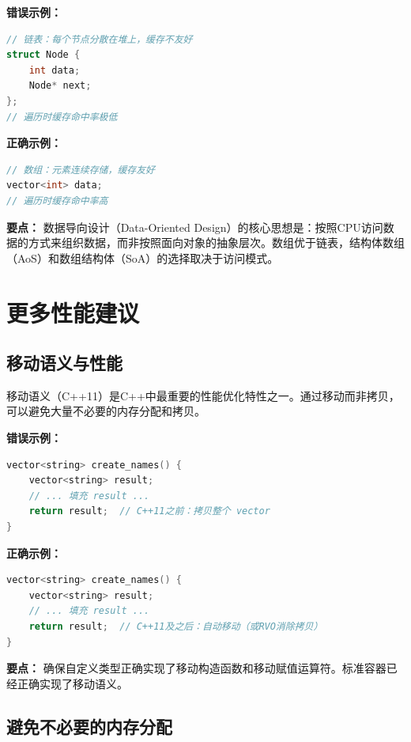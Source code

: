 \textbf{错误示例：}

\begin{lstlisting}[language=C++]
// 链表：每个节点分散在堆上，缓存不友好
struct Node {
    int data;
    Node* next;
};
// 遍历时缓存命中率极低
\end{lstlisting}

\textbf{正确示例：}

\begin{lstlisting}[language=C++]
// 数组：元素连续存储，缓存友好
vector<int> data;
// 遍历时缓存命中率高
\end{lstlisting}

\textbf{要点：} 数据导向设计（Data-Oriented Design）的核心思想是：按照CPU访问数据的方式来组织数据，而非按照面向对象的抽象层次。数组优于链表，结构体数组（AoS）和数组结构体（SoA）的选择取决于访问模式。

\section{更多性能建议}

\subsection*{移动语义与性能}

移动语义（C++11）是C++中最重要的性能优化特性之一。通过移动而非拷贝，可以避免大量不必要的内存分配和拷贝。

\textbf{错误示例：}

\begin{lstlisting}[language=C++]
vector<string> create_names() {
    vector<string> result;
    // ... 填充 result ...
    return result;  // C++11之前：拷贝整个 vector
}
\end{lstlisting}

\textbf{正确示例：}

\begin{lstlisting}[language=C++]
vector<string> create_names() {
    vector<string> result;
    // ... 填充 result ...
    return result;  // C++11及之后：自动移动（或RVO消除拷贝）
}
\end{lstlisting}

\textbf{要点：} 确保自定义类型正确实现了移动构造函数和移动赋值运算符。标准容器已经正确实现了移动语义。

\subsection*{避免不必要的内存分配}


